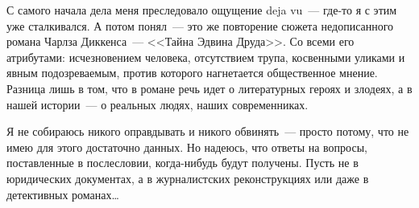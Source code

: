 С самого начала дела меня преследовало ощущение deja vu~--- где-то я с этим уже сталкивался. А потом понял~--- это же повторение сюжета недописанного романа Чарлза Диккенса~--- <<Тайна Эдвина Друда>>. Со всеми его атрибутами: исчезновением человека, отсутствием трупа, косвенными уликами и явным подозреваемым, против которого нагнетается общественное мнение. Разница лишь в том, что в романе речь идет о литературных героях и злодеях, а в нашей истории~--- о реальных людях, наших современниках.

Я не собираюсь никого оправдывать и никого обвинять~--- просто потому, что не имею для этого достаточно данных. Но надеюсь, что ответы на вопросы, поставленные в послесловии, когда-нибудь будут получены. Пусть не в юридических документах, а в журналистских реконструкциях или даже в детективных романах\dots